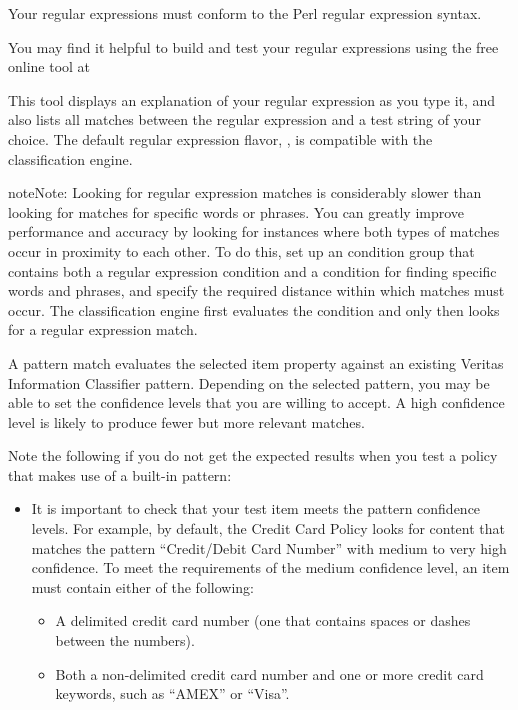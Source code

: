 \documentclass[letterpaper,10pt,english]{sphinxmanual}
\begin{document}

Your regular expressions must conform to the Perl regular expression syntax.

You may find it helpful to build and test your regular expressions using the free online tool at 

This tool displays an explanation of your regular expression as you type it, and also lists all matches between the regular expression and a test string of your choice. The default regular expression flavor, , is compatible with the classification engine.

\begin{sphinxadmonition}{note}{Note:}
Looking for regular expression matches is considerably slower than looking for matches for specific words or phrases. You can greatly improve performance and accuracy by looking for instances where both types of matches occur in proximity to each other. To do this, set up an  condition group that contains both a regular expression condition and a  condition for finding specific words and phrases, and specify the required distance within which matches must occur. The classification engine first evaluates the  condition and only then looks for a regular expression match.
\end{sphinxadmonition}


A pattern match evaluates the selected item property against an existing Veritas Information Classifier pattern. Depending on the selected pattern, you may be able
to set the confidence levels that you are willing to accept. A high confidence level is likely to produce fewer but more relevant matches.

Note the following if you do not get the expected results when you test a policy that makes use of a built-in pattern:
\begin{itemize}
\item {} 
It is important to check that your test item meets the pattern confidence levels. For example, by default, the Credit Card Policy looks for content that matches the pattern “Credit/Debit Card Number” with medium to very high confidence. To meet the requirements of the medium confidence level, an item must contain either of the following:
\begin{itemize}
\item {} 
A delimited credit card number (one that contains spaces or dashes between the numbers).

\item {} 
Both a non-delimited credit card number and one or more credit card keywords, such as “AMEX” or “Visa”.

\end{itemize}

\end{itemize}
\end{document}
